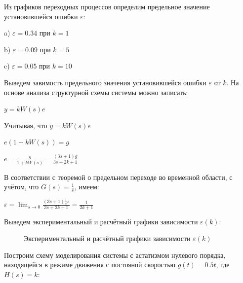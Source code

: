 \documentclass[a4paper, 11pt]{article}
\begin{document}
\par 
Из графиков переходных процессов определим предельное значение установившейся ошибки $\varepsilon$:
\par 
a) $\varepsilon=0.34$ при $k=1$ 
\par 
b) $\varepsilon=0.09$ при $k=5$
\par 
c) $\varepsilon=0.05$ при $k=10$

\newpage
\par 
Выведем завимость предельного значения установившейся ошибки $\varepsilon$ от $k$. На основе анализа структурной схемы системы можно записать:
\par 
$\displaystyle y=kW(s)e$
\par 
Учитывая, что $y=kW(s)e$
\par 
$\displaystyle e(1+kW(s))=g$
\par 
$e=\displaystyle \frac{g}{1+kW(s)}=\frac{(3s+1)g}{3s+2k+1}$
\par 
В соответствии с теоремой о предельном переходе во временной области, с учётом, что $G(s)=\displaystyle \frac{1}{s}$, имеем:
\par 
$\varepsilon=\lim_{s\to 0}\displaystyle \frac{(3s+1)\frac{1}{s}s}{3s+2k+1}=\frac{1}{2k+1}$
\par 
Выведем экспериментальный и расчётный графики зависимости $\varepsilon(k)$:

\begin{figure}[h!]
\caption{Экспериментальный и расчётный графики зависимости $\varepsilon(k)$}
\label{ris:image}
\end{figure}

\newpage
\par 
Построим схему моделирования системы с астатизмом нулевого порядка, находящейся в режиме движения с постояной скоростью $g(t)=0.5t$, где $H(s)=k$:
\end{document}
